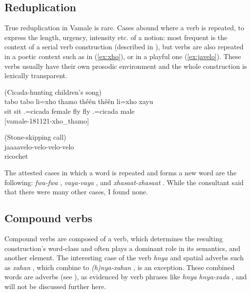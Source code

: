 \subsection{Reduplication}
\label{sec:redup}
True reduplication in Vamale is rare. Cases abound where a verb is repeated, to express the length, urgency, intensity etc. of a notion: most frequent is the context of a serial verb construction (described in ), but verbs are also repeated in a poetic context such as in (\ref{ex:xho}), or in a playful one (\ref{ex:javelo}). These verbs usually have their own prosodic environment and the whole construction is lexically transparent.\largerpage[-1]


\ea \label{ex:xho}
(Cicada-hunting children's song)\\
\gll tabo tabo li=xho thamo thêên thêên li=xho xayu\\
 sit sit .=cicada female fly fly .=cicada male\\
\glt {} {[vamale-181121-xho\_thamo]}
\z

\ea \label{ex:javelo}
(Stone-skipping call)\\
\gll jaaaavelo-velo-velo-velo\\
 ricochet\\
\glt {}
\z

The attested cases in which a word is repeated and forms a new word are the following: \textit{fwa-fwa}  , \textit{vaya-vaya}  , and \textit{xhasaat-xhasaat}  . While the consultant said that there were many other cases, I found none.

\subsection{Compound verbs}
\label{ssec:CompoundV}
\largerpage[-2]
Compound verbs are composed of a verb, which determines the resulting construction's word-class and often plays a dominant role in its semantics, and another element. The interesting case of the verb \textit{hnya}  and spatial adverbs such as \textit{xahan} , which combine to \textit{(h)nya-xahan} , is an exception. These combined words are adverbs (see ), as evidenced by verb phrases like \textit{hnya hnya-xada} , and will not be discussed further here.

